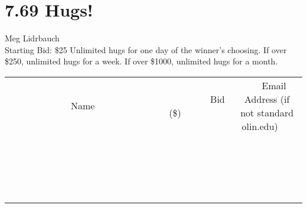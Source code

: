 \documentclass[11pt]{article}
\begin{document}
\section*{7.69 Hugs!}
Meg Lidrbauch
\\
Starting Bid: \$25
\newline
Unlimited hugs for one day of the winner's choosing. If over \$250, unlimited hugs for a week. If over \$1000, unlimited hugs for a month.
\\[3ex]
\begin{tabular}{c c c}
~~~~~~~~~~~~~Name~~~~~~~~~~~~~ & ~~~~~~~~~Bid (\$)~~~~~~~~~  & ~~~Email Address (if not standard olin.edu)~~~\\
 & & \\
\hline
 & & \\
\hline
 & & \\
\hline
 & & \\
\hline
 & & \\
\hline
 & & \\
\hline
 & & \\
\hline
 & & \\
\hline
 & & \\
\hline
 & & \\
\hline
 & & \\
\hline
 & & \\
\hline
 & & \\
\hline
 & & \\
\hline
 & & \\
\hline
 & & \\
\hline
 & & \\
\hline
 & & \\
\hline
 & & \\
\hline
\end{tabular}
\newpage
\end{document}
